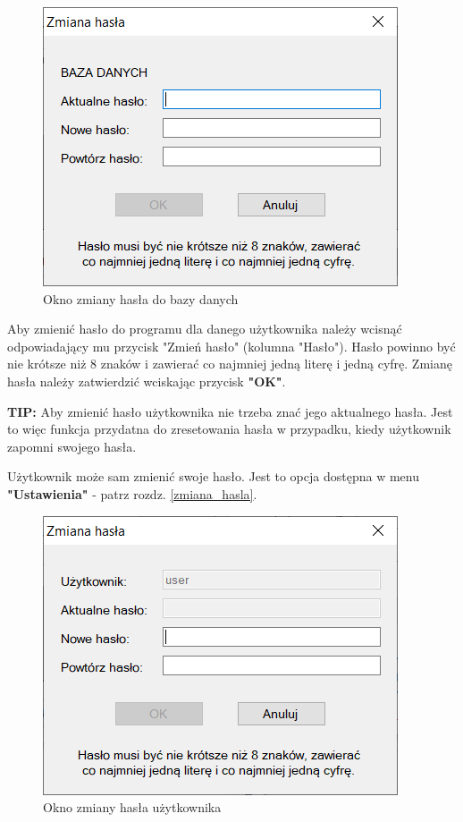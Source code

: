 \begin{figure}[htb]
	\centering
	\includegraphics{obrazki/Logowanie/zmiana_hasla_bazy.png}
	\caption{Okno zmiany hasła do bazy danych}
	\label{zmianaHaslaBazy}
\end{figure}

Aby zmienić hasło do programu dla danego użytkownika należy wcisnąć odpowiadający mu przycisk "Zmień hasło" (kolumna "Hasło"). Hasło powinno być nie krótsze niż 8 znaków i zawierać co najmniej jedną literę i jedną cyfrę. Zmianę hasła należy zatwierdzić wciskając przycisk \textbf{"OK"}.

\textbf{TIP:} Aby zmienić hasło użytkownika nie trzeba znać jego aktualnego hasła. Jest to więc funkcja przydatna do zresetowania hasła w przypadku, kiedy użytkownik zapomni swojego hasła.

Użytkownik może sam zmienić swoje hasło. Jest to opcja dostępna w menu \textbf{"Ustawienia"} - patrz rozdz. \ref{zmiana_hasla}. 

\begin{figure}[H]
	\centering
	\includegraphics{obrazki/Logowanie/zmiana_hasla_uzytkownika.png}
	\caption{Okno zmiany hasła użytkownika}
	\label{zmianaHaslaUzytkownika}
\end{figure}
